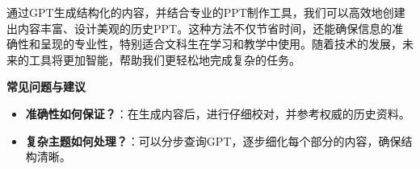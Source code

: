 通过GPT生成结构化的内容，并结合专业的PPT制作工具，我们可以高效地创建出内容丰富、设计美观的历史PPT。这种方法不仅节省时间，还能确保信息的准确性和呈现的专业性，特别适合文科生在学习和教学中使用。随着技术的发展，未来的工具将更加智能，帮助我们更轻松地完成复杂的任务。

\textbf{常见问题与建议}

\begin{itemize}

  \item
        \textbf{准确性如何保证？}：在生成内容后，进行仔细校对，并参考权威的历史资料。
  \item
        \textbf{复杂主题如何处理？}：可以分步查询GPT，逐步细化每个部分的内容，确保结构清晰。
\end{itemize}
